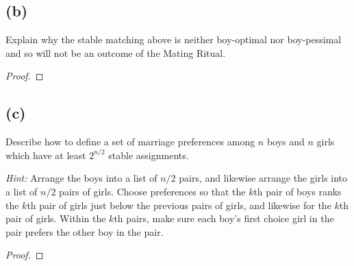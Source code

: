 \documentclass[14pt]{extarticle}
\begin{document}
\subsection{(b)}
Explain why the stable matching above is neither boy-optimal nor boy-pessimal and so will not be an outcome of the Mating Ritual.
\begin{proof}
\end{proof}
\subsection{(c)}
Describe how to define a set of marriage preferences among $n$ boys and $n$ girls which have at least $2^{n/2}$ stable assignments.

{\it Hint:} Arrange the boys into a list of $n/2$ pairs, and likewise arrange the girls into a list of $n/2$ pairs of girls. Choose preferences so that the $k$th pair of boys ranks the $k$th pair of girls just below the previous pairs of girls, and likewise for the $k$th pair of girls. Within the $k$th pairs, make sure each boy’s first choice girl in the pair prefers the other boy in the pair.
\begin{proof}
\end{proof}
\end{document}
